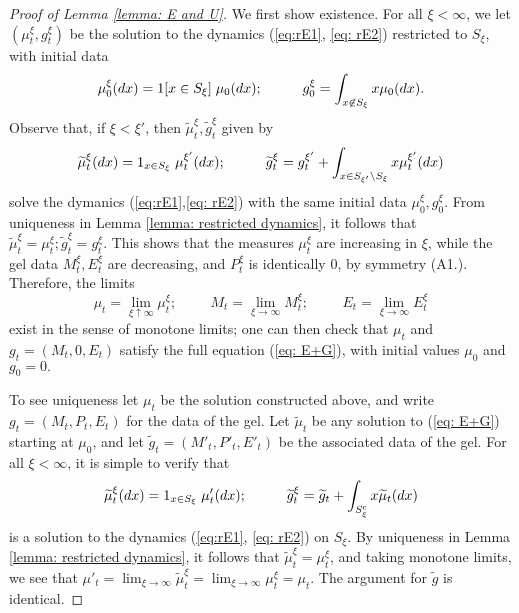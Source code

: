 \documentclass[11pt, notitlepage]{article}
\begin{document}
\begin{proof}[Proof of Lemma \ref{lemma: E and U}] 
We first show existence. For all $\xi<\infty$, we let $(\mu^\xi_t, g^\xi_t)$ be the solution to the dynamics (\ref{eq:rE1}, \ref{eq: rE2}) restricted to $S_\xi$, with initial data \begin{equation} \mu^\xi_0(dx)=1[x\in S_\xi]\hspace{0.1cm}\mu_0(dx);\hspace{1cm} g^\xi_0 = \int_{x\not\in S_\xi} x\mu_0(dx). \end{equation}  Observe that, if $\xi<\xi'$, then $\widetilde{\mu}^\xi_t, \widetilde{g}^\xi_t$ given by \begin{equation} \widetilde{\mu}^\xi_t(dx)=1_{x\in S_\xi}\hspace{0.1cm}\mu^{\xi'}_t(dx);\hspace{1cm} \widetilde{g}^\xi_t=g^{\xi'}_t+\int_{x\in S_{\xi'}\setminus S_\xi} x \mu^{\xi'}_t(dx)\end{equation} solve the dymanics (\ref{eq:rE1},\ref{eq: rE2}) with the same initial data $\mu^\xi_0, g^\xi_0$. From uniqueness in Lemma \ref{lemma: restricted dynamics}, it follows that $\widetilde{\mu}^\xi_t=\mu^\xi_t; \widetilde{g}^\xi_t=g^\xi_t$. This shows that the measures $\mu^\xi_t$ are increasing in $\xi$, while the gel data $M^\xi_t, E^\xi_t$ are decreasing, and $P^\xi_t$ is identically $0$, by symmetry ({A1}.). Therefore, the limits \begin{equation} \mu_t=\lim_{\xi\uparrow \infty} \mu^\xi_t; \hspace{1cm} M_t=\lim_{\xi\rightarrow \infty} M^\xi_t; \hspace{1cm} E_t=\lim_{\xi\rightarrow \infty} E^\xi_t \end{equation} exist in the sense of monotone limits; one can then check that $\mu_t$ and $g_t=(M_t,0,E_t)$ satisfy the full equation (\ref{eq: E+G}), with initial values $\mu_0$ and $g_0=0.$

To see uniqueness let $\mu_t$ be the solution constructed above, and write $g_t=(M_t,P_t,E_t)$ for the data of the gel. Let $\widetilde{\mu}_t$ be any solution to (\ref{eq: E+G}) starting at $\mu_0$, and let $\widetilde{g}_t=(M'_t, P'_t,E'_t)$ be the associated data of the gel. For all $\xi<\infty$, it is simple to verify that \begin{equation} \widetilde{\mu}^\xi_t(dx)=1_{x\in S_\xi}\hspace{0.1cm} \mu'_t(dx);\hspace{1cm} \widetilde{g}^\xi_t=\widetilde{g}_t+\int_{S^\mathrm{c}_\xi} x \widetilde{\mu}_t(dx) \end{equation} is a solution to the dynamics (\ref{eq:rE1}, \ref{eq: rE2}) on $S_\xi$. By uniqueness in Lemma \ref{lemma: restricted dynamics}, it follows that $\widetilde{\mu}^\xi_t=\mu^\xi_t$, and taking monotone limits, we see that $\mu'_t=\lim_{\xi\rightarrow \infty} \widetilde{\mu}^\xi_t=\lim_{\xi\rightarrow \infty} {\mu}^\xi_t=\mu_t$. The argument for $\widetilde{g}$ is identical.
\end{proof}
\iffalse 
\end{document}
